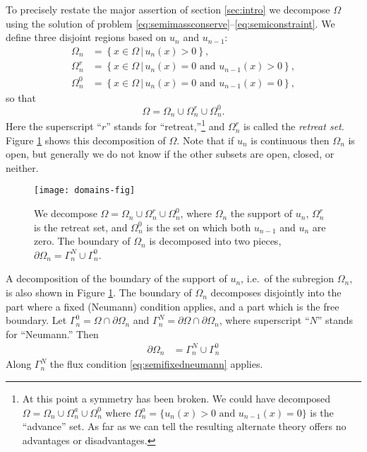 \documentclass[final,leqno,onefignum,onetabnum]{siamltex1213bueler}
\begin{document}
To precisely restate the major assertion of section \ref{sec:intro} we decompose $\Omega$ using the solution of problem \eqref{eq:semimassconserve}--\eqref{eq:semiconstraint}.   We define three disjoint regions based on $u_n$ and $u_{n-1}$:
\begin{align*}
\Omega_n &= \left\{x \in \Omega \,\big|\, u_n(x)>0\right\}, \\
\Omega_n^r &= \left\{x \in \Omega \,\big|\, u_n(x)=0 \text{ and } u_{n-1}(x) > 0\right\}, \\
\Omega_n^0 &= \left\{x \in \Omega \,\big|\, u_n(x)=0 \text{ and } u_{n-1}(x) = 0\right\},
\end{align*}
so that
\begin{equation}
\Omega = \Omega_n \cup \Omega_n^r \cup \Omega_n^0.  \label{eq:omegadecomposition}
\end{equation}
Here the superscript ``$r$'' stands for ``retreat,''\footnote{At this point a symmetry has been broken.  We could have decomposed $\Omega= \Omega_n \cup \Omega_n^a \cup \Omega_n^0$ where $\Omega_n^a = \{u_n(x) > 0 \text{ and } u_{n-1}(x) = 0\}$ is the ``advance'' set.  As far as we can tell the resulting alternate theory offers no advantages or disadvantages.} and $\Omega_n^r$ is called the \emph{retreat set}.  Figure \ref{fig:domains} shows this decomposition of $\Omega$.  Note that if $u_n$ is continuous then $\Omega_n$ is open, but generally we do not know if the other subsets are open, closed, or neither.

\begin{figure}[ht]
\begin{center}
\texttt{[image: domains-fig]}
\end{center}
\caption{We decompose $\Omega = \Omega_n \cup \Omega_n^r \cup \Omega_n^0$, where $\Omega_n$ the support of $u_n$, $\Omega_n^r$ is the retreat set, and $\Omega_n^0$ is the set on which both $u_{n-1}$ and $u_n$ are zero.  The boundary of $\Omega_n$ is decomposed into two pieces, $\partial\Omega_n = \Gamma_n^N \cup \Gamma_n^0$.}
\label{fig:domains}
\end{figure}

A decomposition of the boundary of the support of $u_n$, i.e.~of the subregion $\Omega_n$, is also shown in Figure \ref{fig:domains}.  The boundary of $\Omega_n$ decomposes disjointly into the part where a fixed (Neumann) condition applies, and a part which is the free boundary.  Let $\Gamma_n^0 = \Omega \cap \partial \Omega_n$ and $\Gamma_n^N = \partial \Omega \cap \partial \Omega_n$, where superscript ``$N$'' stands for ``Neumann.''  Then
\begin{align*}
\partial\Omega_n &= \Gamma_n^N \cup \Gamma_n^0
\end{align*}
Along $\Gamma_n^N$ the flux condition \eqref{eq:semifixedneumann} applies.
\end{document}
